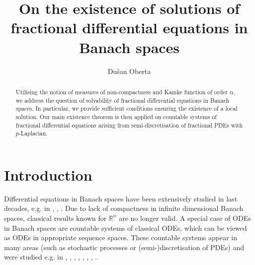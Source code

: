 \documentclass[reqno]{amsart}
\numberwithin{equation}{section}
\theoremstyle{definition}
\theoremstyle{remark}
\newcommand{\R}{\mathbb{R}}
\begin{document}
	\title[On the existence of solutions of fractional differential equations in Banach spaces]{On the existence of solutions of fractional differential equations in Banach spaces}
	\author[D. Oberta]{Dušan Oberta}
	\address{Institute of Mathematics, Faculty of Mechanical Engineering, Brno University of Technology, Technická 2, 616 69 Brno, Czech Republic}
	
	\begin{abstract}
		Utilising the notion of measures of non-compactness and Kamke function of order $\alpha$, we address the question of solvability of fractional differential equations in Banach spaces. In particular, we provide sufficient conditions ensuring the existence of a local solution. Our main existence theorem is then applied on countable systems of fractional differential equations arising from semi-discretisation of fractional PDEs with $p$-Laplacian.
	\end{abstract}
	
	\maketitle
	
	\section{Introduction}\label{sec_01}
	\setcounter{section}{1}
	\setcounter{equation}{0}
	Differential equations in Banach spaces have been extensively studied in last decades, e.g. in \cite{Deimling}, \cite{Ladas_Lakshmikantham}, \cite{Lakshmikantham_Leela}. Due to lack of compactness in infinite dimensional Banach spaces, classical results known for $\R^n$ are no longer valid. A special case of ODEs in Banach spaces are countable systems of classical ODEs, which can be viewed as ODEs in appropriate sequence spaces. These countable systems appear in many areas (such as stochastic processes or (semi-)discretisation of PDEs) and were studied e.g. in \cite{Banas_paper_ExistenceTheorem}, \cite{Banas_paper_SolvabilityOfInifiniteSystems}, \cite{Banas_book_sequences}, \cite{Banas_paper_ExistenceOfSolutions}, \cite{Han_Kloeden}, \cite{Samoilenko}, \cite{Slavik_multidimensional}, \cite{Slavik}.
	
\end{document}
